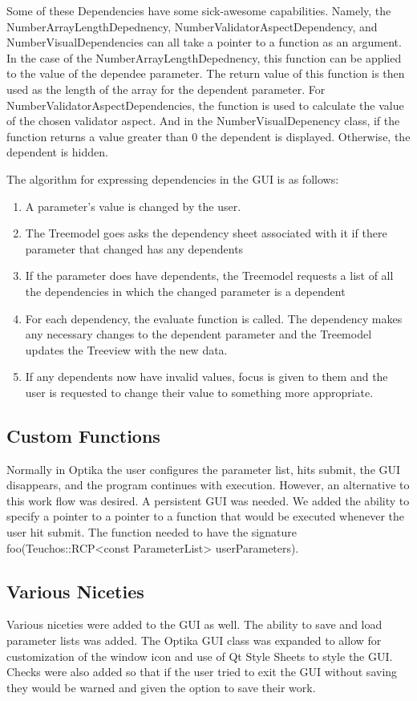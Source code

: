 	Some of these Dependencies have some sick-awesome capabilities. Namely, the NumberArrayLengthDepednency, NumberValidatorAspectDependency, and NumberVisualDependencies
	can all take a pointer to a function as an argument. In the case of the NumberArrayLengthDepednency, this function can be applied to the value of the dependee
	parameter. The return value of this function is then used as the length of the array for the dependent parameter. For NumberValidatorAspectDependencies, the function
	is used to calculate the value of the chosen validator aspect. And in the NumberVisualDepenency class, if the function returns a value greater than 0 the dependent is
	displayed. Otherwise, the dependent is hidden. 

	The algorithm for expressing dependencies in the GUI is as follows:
	\begin{enumerate}
		\item A parameter's value is changed by the user.
		\item The Treemodel goes asks the dependency sheet associated with it if there parameter that changed has any dependents
		\item If the parameter does have dependents, the Treemodel requests a list of all the dependencies in which the changed
		parameter is a dependent
		\item For each dependency, the evaluate function is called. The dependency makes any necessary changes to the dependent parameter
		and the Treemodel updates the Treeview with the new data.
		\item If any dependents now have invalid values, focus is given to them and the user is requested to change their value to
		something more appropriate.
	\end{enumerate}

	\subsection{Custom Functions}
	Normally in Optika the user configures the parameter list, hits submit, the GUI disappears, and the program continues with execution. However,
	an alternative to this work flow was desired. A persistent GUI was needed. We added the ability to specify a pointer to a pointer to a function
	that would be executed whenever the user hit submit. The function needed to have the signature foo(Teuchos::RCP<const ParameterList> userParameters).

	\subsection{Various Niceties}
	Various niceties were added to the GUI as well. The ability to save and load parameter lists was added. The Optika GUI class was expanded to allow for
	customization of the window icon and use of Qt Style Sheets to style the GUI. Checks were also added so that if the user tried to exit the GUI without
	saving they would be warned and given the option to save their work.

